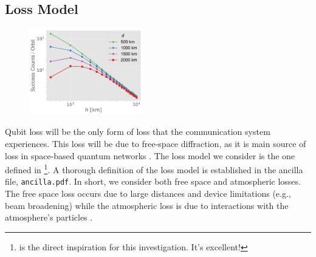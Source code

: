 
\subsection{Loss Model}

\begin{figure}
    \centering
    \vspace{-.1\baselineskip}
    \includegraphics[width=0.44\textwidth]{figures/success-counts.pdf}
    \caption{}
    \label{fig:success-counts}
\end{figure}

Qubit loss will be the only form of loss that the communication system experiences. This loss will be due to free-space diffraction, as it is main source of loss in space-based quantum networks \cite{khatri2021}. The loss model we consider is the one defined in \cite{khatri2021}\footnote{\cite{khatri2021} is the direct inspiration for this investigation. It's excellent!}. A thorough definition of the loss model is established in the ancilla file, \texttt{ancilla.pdf}. In short, we consider both free space and atmospheric losses. The free space loss occurs due to large distances and device limitations (e.g., beam broadening) while the atmospheric loss is due to interactions with the atmosphere's particles \cite{khatri2021}.

